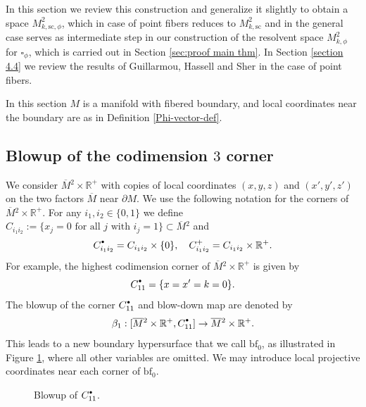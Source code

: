 \documentclass[JEP,XML,SOM,Unicode,NoFloatCountersInSection,published]{cedram}
\newcommand{\bbullet}{{\scriptscriptstyle\bullet}}
\newcommand{\sbullet}{{\raisebox{1pt}{$\bbullet$}}}
\theoremstyle{plain}
\theoremstyle{definition}
\newcommand{\R}{{\mathbb{R}}}
\newcommand{\lf}{{\mathrm{lb}}}
\newcommand{\rf}{{\mathrm{rb}}}
\newcommand{\bbf}{{\mathrm{bf}}}
\newcommand{\bfz}{{\bbf_0}}
\newcommand{\ssc}{{\mathrm{sc}}}
\newcommand{\zf}{{\mathrm{zf}}}
\newcommand{\Mbar}{{\overline{M}}}\let\M\Mbar
\begin{document}
In this section we review this construction and generalize it slightly to obtain a space $M^2_{k,\ssc,\phi}$, which in case of point fibers reduces to $M^2_{k,\ssc}$ and in the general case serves as intermediate step in our construction of the resolvent space $M^2_{k,\phi}$ for $\square_\phi$, which is carried out in Section \ref{sec:proof main thm}.
In Section \ref{section 4.4} we review the results of Guillarmou, Hassell and Sher in the case of point fibers.

In this section $M$ is a manifold with fibered boundary, and local coordinates near the boundary are as in Definition \ref{Phi-vector-def}.

\subsection{Blowup of the codimension $3$ corner}
We consider $\Mbar{}^2 \times \R^+$ with copies of local
coordinates $(x,y,z)$ and $(x',y',z')$ on the two factors $\Mbar$ near $\partial M$.
We use the following notation for the corners of $\Mbar{}^2\times \R^+$.
For any $i_1,i_2 \in \{0,1\}$ we define
$
C_{i_1i_2} := \{x_j = 0 \text{ for all $j$ with } i_j = 1\} \subset \Mbar{}^2
$
and
\[
C_{i_1i_2}^\sbullet = C_{i_1i_2}\times \{0\},\quad C_{i_1i_2}^+ = C_{i_1i_2} \times \R^+.
\]
For example, the highest codimension corner of $\Mbar{}^2\times \R^+$ is given by
\[
C_{11}^\sbullet = \{ x = x' = k =0\}.
\]
The blowup of the corner $C_{11}^\sbullet$ and blow-down map are denoted by
\[
\beta_1:[\Mbar{}^2 \times \R^+, C_{11}^\sbullet]\to \Mbar{}^2 \times \R^+.
\]
This leads to a new boundary hypersurface that we call $\bfz$, as illustrated in Figure
\ref{figure 4}, where all other variables are omitted. We may introduce local projective coordinates near
each corner of $\bfz$.

\begin{figure}[htb]
\centering
{}
\caption{ Blowup of $C_{11}^\sbullet$.} \label{figure 4}
\end{figure}
\end{document}
